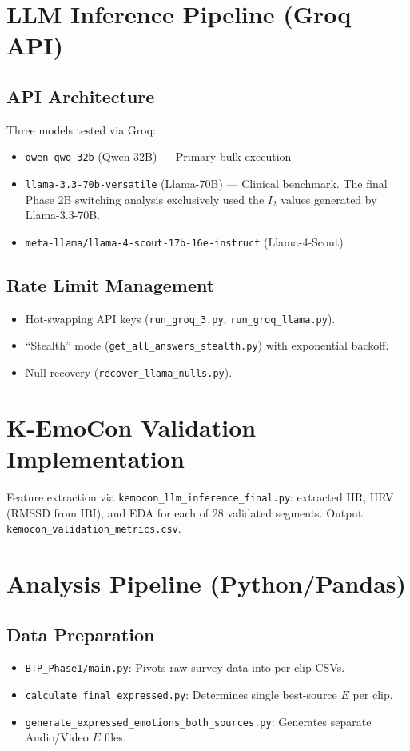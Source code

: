\documentclass[11pt, a4paper]{report}
\begin{document}
\section{LLM Inference Pipeline (Groq API)}
\subsection{API Architecture}
Three models tested via Groq:
\begin{itemize}
    \item \texttt{qwen-qwq-32b} (Qwen-32B) --- Primary bulk execution
    \item \texttt{llama-3.3-70b-versatile} (Llama-70B) --- Clinical benchmark. The final Phase 2B switching analysis exclusively used the $I_2$ values generated by Llama-3.3-70B.
    \item \texttt{meta-llama/llama-4-scout-17b-16e-instruct} (Llama-4-Scout)
\end{itemize}

\subsection{Rate Limit Management}
\begin{itemize}
    \item Hot-swapping API keys (\texttt{run\_groq\_3.py}, \texttt{run\_groq\_llama.py}).
    \item ``Stealth'' mode (\texttt{get\_all\_answers\_stealth.py}) with exponential backoff.
    \item Null recovery (\texttt{recover\_llama\_nulls.py}).
\end{itemize}

\section{K-EmoCon Validation Implementation}
Feature extraction via \texttt{kemocon\_llm\_inference\_final.py}: extracted HR, HRV (RMSSD from IBI), and EDA for each of 28 validated segments. Output: \texttt{kemocon\_validation\_metrics.csv}.

\section{Analysis Pipeline (Python/Pandas)}
\subsection{Data Preparation}
\begin{itemize}
    \item \texttt{BTP\_Phase1/main.py}: Pivots raw survey data into per-clip CSVs.
    \item \texttt{calculate\_final\_expressed.py}: Determines single best-source $E$ per clip.
    \item \texttt{generate\_expressed\_emotions\_both\_sources.py}: Generates separate Audio/Video $E$ files.
\end{itemize}
\end{document}
